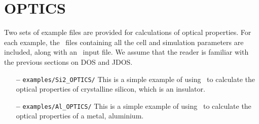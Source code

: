 \documentclass[a4paper,11pt,twoside]{book}
\begin{document}
{\section{OPTICS}
Two sets of example files are provided for calculations of optical properties.  For each example, the \castep\ files containing all the cell and simulation parameters are included, along with an \optados\ input file. We assume that the reader is familiar with the previous sections on DOS and JDOS.
\begin{itemize}
\item[{\bf --}]  \verb#examples/Si2_OPTICS/#  This is a simple example of using \optados\ to calculate the optical properties of crystalline silicon, which is an insulator.
\item[{\bf --}]\verb#examples/Al_OPTICS/#  This is a simple example of using \optados\ to calculate the optical properties of a metal, aluminium.
\end{itemize}

}
\end{document}
